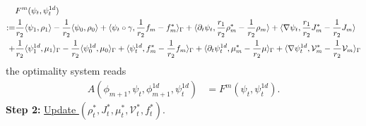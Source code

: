 \documentclass{article}
\DeclarePairedDelimiter{\skp}{\langle}{\rangle}
\begin{document}
\begin{align*}
    &F^m(\psi_t, \psi_t^{1d})\\
    :=& \frac{1}{r_2}\skp{\psi_1,\rho_1} - \frac{1}{r_2}\skp{\psi_0, \rho_0} + \skp{\psi_t\circ\gamma, \frac{1}{r_2}f_m -f^*_m}_\Gamma + \skp{\partial_t\psi_t, \frac{r_1}{r_2}\rho^*_m - \frac{1}{r_2}\rho_m} + \skp{\nabla\psi_t, \frac{r_1}{r_2} J^*_m-\frac{1}{r_2}J_m}\\
    +& \frac{1}{r_2}\skp{\psi^{1d}_1, \mu_1}_\Gamma - \frac{1}{r_2}\skp{\psi^{1d}_0, \mu_0}_\Gamma + \skp{\psi_t^{1d}, f^*_m - \frac{1}{r_2}f_m}_\Gamma + \skp{\partial_t\psi_t^{1d}, \mu^*_m - \frac{1}{r_2}\mu}_\Gamma + \skp{\nabla\psi_t^{1d}, \mathcal{V}^*_m - \frac{1}{r_2}{\mathcal{V}_m}}_\Gamma
\end{align*}
the optimality system reads
\begin{align*}
    A(\phi_{m+1}, \psi_t, \phi^{1d}_{m+1}, \psi^{1d}_t) &= F^m(\psi_t, \psi^{1d}_t).
\end{align*}
\textbf{Step 2:} \underline{Update $(\rho_t^*, J_t^*, \mu_t^*, \mathcal{V}_t^*, f_t^*)$}.
\end{document}
